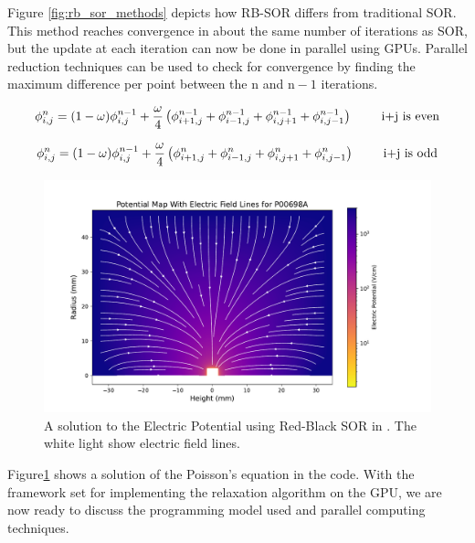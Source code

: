 Figure \ref{fig:rb_sor_methods} depicts how RB-SOR differs from traditional SOR. This method reaches convergence in about the same number of iterations as SOR, but the update at each iteration can now be done in parallel using GPUs. Parallel reduction techniques can be used to check for convergence by finding the maximum difference per point between the $\text{n}$ and $\text{n}-1$ iterations. 

\begin{equation}{\label{rb_e}}
 \phi_{i,j}^{n} = (1-\omega)\phi^{n-1}_{i,j} + \frac{\omega}{4} \left(\phi^{n-1}_{i+1,j} + \phi^{n-1}_{i-1,j} + \phi^{n-1}_{i,j+1} + \phi^{n-1}_{i,j-1} \right) \qquad \text{ i+j is even}
\end{equation}

\begin{equation}{\label{rb_o}}
 \phi_{i,j}^{n} = (1-\omega)\phi^{n-1}_{i,j} + \frac{\omega}{4} \left(\phi^{n}_{i+1,j} + \phi^n_{i-1,j} + \phi^{n}_{i,j+1} + \phi^n_{i,j-1} \right) \qquad \text{ i+j is odd}
\end{equation}

\begin{figure}[!htb]
\centering
 \includegraphics[width=\linewidth]{ch4/figs/elect_pot_P00698A.pdf}
\caption{\label{fig:sor_pot_sol} A solution to the Electric Potential using Red-Black SOR in {\ehd}. The white light show electric field lines.}
\label{ch4:fig:elect_pot_soln}
\end{figure}

Figure\ref{ch4:fig:elect_pot_soln} shows a solution of the Poisson's equation in the code. With the framework set for implementing the relaxation algorithm on the GPU, we are now ready to discuss the programming model used and parallel computing techniques.


